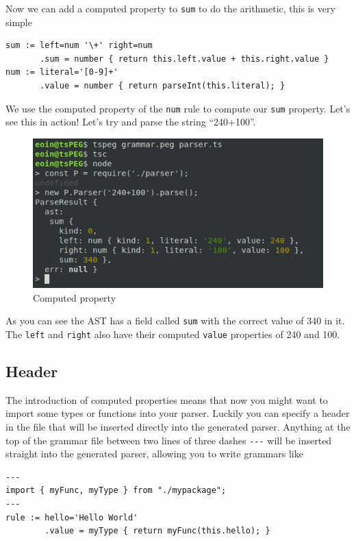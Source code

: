 Now we can add a computed property to \texttt{sum} to do the arithmetic,
this is very simple

\begin{verbatim}
sum := left=num '\+' right=num
       .sum = number { return this.left.value + this.right.value }
num := literal='[0-9]+'
       .value = number { return parseInt(this.literal); }
\end{verbatim}

We use the computed property of the \texttt{num} rule to compute our
\texttt{sum} property. Let's see this in action! Let's try and parse the
string ``240+100''.

\begin{figure}[ht]
\centering
    \includegraphics[scale=0.7]{src/app1assets/computed.png}
\caption{Computed property}
\end{figure}

As you can see the AST has a field called \texttt{sum} with the correct
value of 340 in it. The \texttt{left} and \texttt{right} also have their
computed \texttt{value} properties of 240 and 100.

\subsection{Header}\label{header}

The introduction of computed properties means that now you might want to
import some types or functions into your parser. Luckily you can specify
a header in the file that will be inserted directly into the generated
parser. Anything at the top of the grammar file between two lines of
three dashes \texttt{-\/-\/-} will be inserted straight into the
generated parser, allowing you to write grammars like

\begin{verbatim}
---
import { myFunc, myType } from "./mypackage";
---
rule := hello='Hello World'
        .value = myType { return myFunc(this.hello); }
\end{verbatim}
